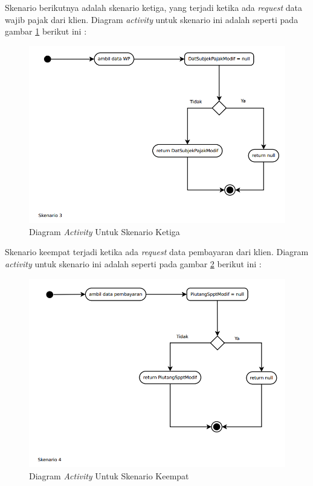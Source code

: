 \documentclass[pdftex,12pt, oneside]{article}
\begin{document}
Skenario berikutnya adalah skenario ketiga, yang terjadi ketika ada \textit{request} data wajib pajak dari klien. Diagram \textit{activity} untuk skenario ini adalah seperti pada gambar \ref{fig:act-dia-be-3} berikut ini :

\begin{figure}[H]
	\centering
	\includegraphics[width=1\textwidth]{./resources/activity-dia-3}
	\caption{Diagram \textit{Activity} Untuk Skenario Ketiga}
	\label{fig:act-dia-be-3}
\end{figure}

Skenario keempat terjadi ketika ada \textit{request} data pembayaran dari klien. Diagram \textit{activity} untuk skenario ini adalah seperti pada gambar \ref{fig:act-dia-be-4} berikut ini :

\begin{figure}[H]
	\centering
	\includegraphics[width=1\textwidth]{./resources/activity-dia-4}
	\caption{Diagram \textit{Activity} Untuk Skenario Keempat}
	\label{fig:act-dia-be-4}
\end{figure}
\end{document}
